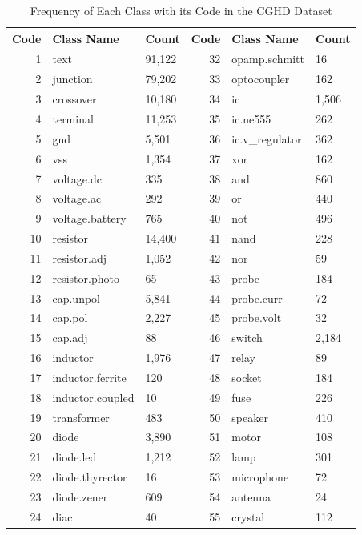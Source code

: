 \begin{table}[H]
    \centering
    \caption{Frequency of Each Class with its Code in the CGHD Dataset}
    \label{table:cghd-classes}
    \begin{tabular}{rll|rll}
        \toprule
        \textbf{Code} & \textbf{Class Name} & \textbf{Count} & \textbf{Code} & \textbf{Class Name} & \textbf{Count} \\
        \midrule
        1 & text & 91,122 & 32 & opamp.schmitt & 16 \\
        2 & junction & 79,202 & 33 & optocoupler & 162 \\
        3 & crossover & 10,180 & 34 & ic & 1,506 \\
        4 & terminal & 11,253 & 35 & ic.ne555 & 262 \\
        5 & gnd & 5,501 & 36 & ic.v\_regulator & 362 \\
        6 & vss & 1,354 & 37 & xor & 162 \\
        7 & voltage.dc & 335 & 38 & and & 860 \\
        8 & voltage.ac & 292 & 39 & or & 440 \\
        9 & voltage.battery & 765 & 40 & not & 496 \\
        10 & resistor & 14,400 & 41 & nand & 228 \\
        11 & resistor.adj & 1,052 & 42 & nor & 59 \\
        12 & resistor.photo & 65 & 43 & probe & 184 \\
        13 & cap.unpol & 5,841 & 44 & probe.curr & 72 \\
        14 & cap.pol & 2,227 & 45 & probe.volt & 32 \\
        15 & cap.adj & 88 & 46 & switch & 2,184 \\
        16 & inductor & 1,976 & 47 & relay & 89 \\
        17 & inductor.ferrite & 120 & 48 & socket & 184 \\
        18 & inductor.coupled & 10 & 49 & fuse & 226 \\
        19 & transformer & 483 & 50 & speaker & 410 \\
        20 & diode & 3,890 & 51 & motor & 108 \\
        21 & diode.led & 1,212 & 52 & lamp & 301 \\
        22 & diode.thyrector & 16 & 53 & microphone & 72 \\
        23 & diode.zener & 609 & 54 & antenna & 24 \\
        24 & diac & 40 & 55 & crystal & 112 \\

\end{tabular}
\end{table}
